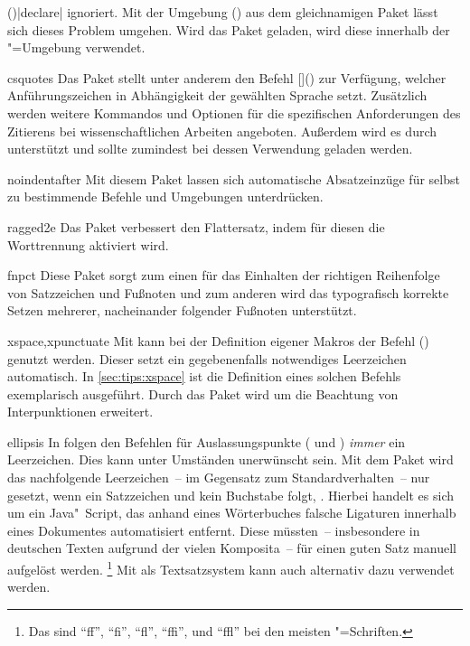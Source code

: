 \begin{packages}
  ()|declare| ignoriert. 
  Mit der Umgebung () aus dem 
  gleichnamigen Paket lässt sich dieses Problem umgehen. Wird das Paket 
  geladen, wird diese innerhalb der "=Umgebung verwendet.
\item[csquotes]
  Das Paket stellt unter anderem den Befehl 
  []() zur Verfügung, welcher 
  Anführungszeichen in Abhängigkeit der gewählten Sprache setzt. Zusätzlich 
  werden weitere Kommandos und Optionen für die spezifischen Anforderungen des 
  Zitierens bei wissenschaftlichen Arbeiten angeboten. Außerdem wird es durch 
   unterstützt und sollte zumindest bei dessen Verwendung 
  geladen werden.
\item[noindentafter]
  Mit diesem Paket lassen sich automatische Absatzeinzüge für selbst zu 
  bestimmende Befehle und Umgebungen unterdrücken.
\item[ragged2e]
  Das Paket verbessert den Flattersatz, indem für diesen die Worttrennung 
  aktiviert wird.
\item[fnpct]
  Diese Paket sorgt zum einen für das Einhalten der richtigen Reihenfolge von 
  Satzzeichen und Fußnoten und zum anderen wird das typografisch korrekte 
  Setzen mehrerer, nacheinander folgender Fußnoten unterstützt.
\item[xspace,xpunctuate]
  Mit  kann bei der Definition eigener Makros der Befehl 
  () genutzt werden. Dieser setzt ein 
  gegebenenfalls notwendiges Leerzeichen automatisch. In 
  \autoref{sec:tips:xspace} ist die Definition eines solchen Befehls 
  exemplarisch ausgeführt. Durch das Paket  wird 
   um die Beachtung von Interpunktionen erweitert.
\item[ellipsis]
  In  folgen den Befehlen für Auslassungspunkte ( und 
  ) \emph{immer} ein Leerzeichen. Dies kann unter Umständen 
  unerwünscht sein. Mit dem Paket  wird das nachfolgende 
  Leerzeichen~-- im Gegensatz zum Standardverhalten~-- nur gesetzt, wenn ein 
  Satzzeichen und kein Buchstabe folgt, .
  Hierbei handelt es sich um ein Java"~Script, das anhand eines Wörterbuches 
  falsche Ligaturen innerhalb eines Dokumentes automatisiert entfernt. Diese 
  müssten~-- insbesondere in deutschen Texten aufgrund der vielen Komposita~-- 
  für einen guten Satz manuell aufgelöst werden.%
  \footnote{%
    Das sind \enquote{ff}, \enquote{fi}, \enquote{fl}, \enquote{ffi}, und 
    \enquote{ffl} bei den meisten "=Schriften.%
  }
  Mit  als Textsatzsystem kann auch  
  alternativ dazu verwendet werden.
%
\end{packages}


